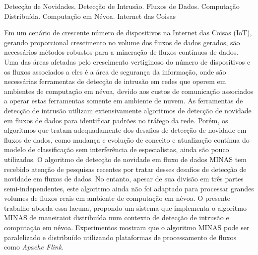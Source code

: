 
\begin{resumo}{Detecção de Novidades. Detecção de Intrusão. Fluxos de Dados.
   Computação Distribuída. Computação em Névoa. Internet das Coisas}

   Em um cenário de crescente número de dispositivos na Internet das Coisas
   (IoT), gerando proporcional crescimento no volume dos fluxos de dados
   gerados, são necessários métodos robustos para a mineração de fluxos
   contínuos de dados.
   Uma das áreas afetadas pelo crescimento vertiginoso do número de dispositivos
   e os fluxos associados a eles é a área de segurança da informação, onde são
   necessárias ferramentas de detecção de intrusão em redes que operem em
   ambientes de computação em névoa, devido aos custos de comunicação associados
   a operar estas ferramentas somente em ambiente de nuvem.
   As ferramentas de detecção de intrusão utilizam extensivamente algoritmos de
   detecção de novidade em fluxos de dados para identificar padrões no tráfego
   da rede.
   Porém, os algoritmos que tratam adequadamente dos desafios de detecção de
   novidade em fluxos de dados, como mudança e evolução de conceito e
   atualização contínua do modelo de classificação sem interferência de
   especialistas, ainda são pouco utilizados.
   O algoritmo de detecção de novidade em fluxo de dados MINAS tem recebido
   atenção de pesquisas recentes por tratar desses desafios de detecção de
   novidade em fluxos de dados.
   No entanto, apesar de sua divisão em três partes semi-independentes, este
   algoritmo ainda não foi adaptado para processar grandes volumes de fluxos
   reais em ambiente de computação em névoa.
   O presente trabalho aborda essa lacuna, propondo um sistema
   que implementa o algoritmo MINAS de maneiraiot distribuída num contexto
   de detecção de intrusão e computação em névoa.
   Experimentos mostram que o algoritmo MINAS pode ser paralelizado e
   distribuído utilizando plataformas de processamento de fluxos como
   \emph{Apache Flink}.
\end{resumo}

